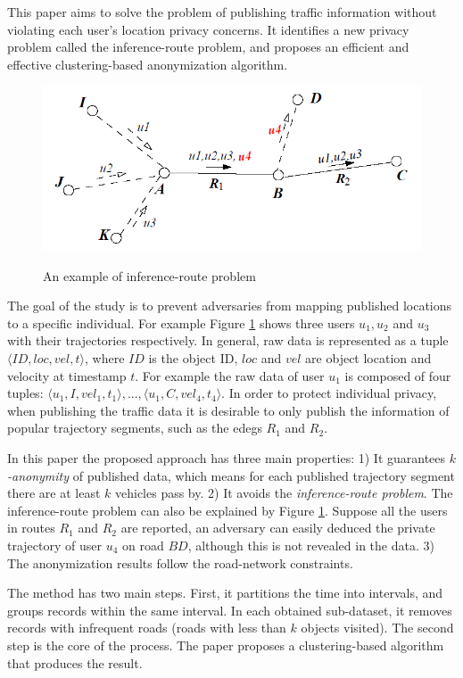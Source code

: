 \documentclass[paper=a4, fontsize=18pt]{article} %
\numberwithin{equation}{section} %
\numberwithin{figure}{section} %
\numberwithin{table}{section} %
\begin{document}
This paper aims to solve the problem of publishing traffic information without violating each user's location privacy concerns. It identifies a new privacy problem called the inference-route problem, and proposes an efficient and effective clustering-based anonymization algorithm.

\begin{figure}[h]
  \centering
  \includegraphics[width=.5\linewidth]{9_5_pub.png}\\
  \caption{An example of inference-route problem}\label{fig:pub}
\end{figure}

The goal of the study is to prevent adversaries from mapping published locations to a specific individual. For example Figure \ref{fig:pub} shows three users $u_1, u_2$ and $u_3$ with their trajectories respectively. In general, raw data is represented as a tuple $\langle ID, loc, vel, t \rangle$, where $ID$ is the object ID, $loc$ and $vel$ are object location and velocity at timestamp $t$. For example the raw data of user $u_1$ is composed of four tuples: $\langle u_1, I, vel_1, t_1 \rangle, ..., \langle u_1, C, vel_4, t_4 \rangle$. In order to protect individual privacy, when publishing the traffic data it is desirable to only publish the information of popular trajectory segments, such as the edegs $R_1$ and $R_2$.

In this paper the proposed approach has three main properties: 1) It guarantees \emph{$k$-anonymity} of published data, which means for each published trajectory segment there are at least $k$ vehicles pass by. 2) It avoids the \emph{inference-route problem}. The inference-route problem can also be explained by Figure \ref{fig:pub}. Suppose all the users in routes $R_1$ and $R_2$ are reported, an adversary can easily deduced the private trajectory of user $u_4$ on road $BD$, although this is not revealed in the data. 3) The anonymization results follow the road-network constraints.

The method has two main steps. First, it partitions the time into intervals, and groups records within the same interval. In each obtained sub-dataset, it removes records with infrequent roads (roads with less than $k$ objects visited). The second step is the core of the process. The paper proposes a clustering-based algorithm that produces the result.
\end{document}
